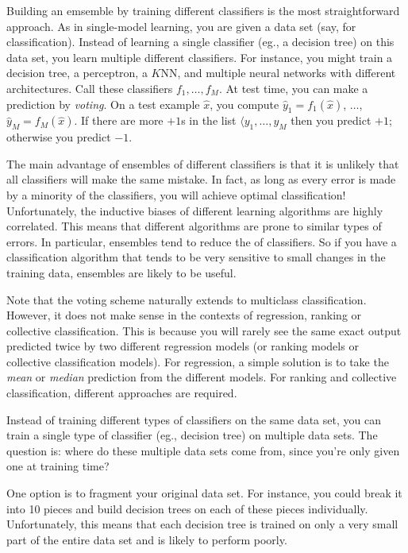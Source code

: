 
Building an emsemble by training different classifiers is the most
straightforward approach.  As in single-model learning, you are given
a data set (say, for classification).  Instead of learning a single
classifier (eg., a decision tree) on this data set, you learn multiple
different classifiers.  For instance, you might train a decision tree,
a perceptron, a $K$NN, and multiple neural networks with different
architectures.  Call these classifiers $f_1, \dots, f_M$.  At test
time, you can make a prediction by \emph{voting}.  On a test example
$\hat x$, you compute $\hat y_1 = f_1(\hat x)$, $\dots$, $\hat y_M =
f_M(\hat x)$.  If there are more $+1$s in the list $\langle y_1,
\dots, y_M$ then you predict $+1$; otherwise you predict $-1$.

The main advantage of ensembles of different classifiers is that it is
unlikely that all classifiers will make the same mistake.  In fact, as
long as every error is made by a minority of the classifiers, you will
achieve optimal classification!  Unfortunately, the inductive biases
of different learning algorithms are highly correlated.  This means
that different algorithms are prone to similar types of errors.  In
particular, ensembles tend to reduce the  of
classifiers.  So if you have a classification algorithm that tends to
be very sensitive to small changes in the training data, ensembles are
likely to be useful.


Note that the voting scheme naturally extends to multiclass
classification.  However, it does not make sense in the contexts of
regression, ranking or collective classification.  This is because you
will rarely see the same exact output predicted twice by two different
regression models (or ranking models or collective classification
models).  For regression, a simple solution is to take the \emph{mean}
or \emph{median} prediction from the different models.  For ranking
and collective classification, different approaches are required.

Instead of training different types of classifiers on the same
data set, you can train a single type of classifier (eg., decision
tree) on multiple data sets.  The question is: where do these multiple
data sets come from, since you're only given one at training time?

One option is to fragment your original data set.  For instance, you
could break it into 10 pieces and build decision trees on each of
these pieces individually.  Unfortunately, this means that each
decision tree is trained on only a very small part of the entire
data set and is likely to perform poorly.

